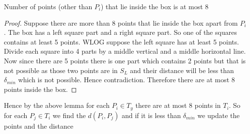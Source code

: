 \begin{center}
	\begin{minipage}{0.7\textwidth}

\begin{lemma}{}{}
	Number of points (other than $P_i$) that lie inside the box is at most 8
\end{lemma}
\begin{proof}
	Suppose there are more than 8 points that lie inside the box apart from $P_i$. The box has a left square part and a right square part. So one of the squares contains at least 5 points. WLOG suppose the left square has at least 5 points. Divide each square into 4 parts by a middle vertical and a middle horizontal line. Now since there are 5 points there is one part which contains 2 points but that is not possible as those two points are in $S_L$ and their distance will be less than $\delta_{min}$ which is not possible. Hence contradiction. Therefore there are at most 8 points inside the box.
\end{proof}\parinn

Hence by the above lemma for each $P_i\in T_y$ there are at most 8 points in $T_i$. So for each $P_j\in T_i$ we find the $d(P_i,P_j)$ and if it is less than $\delta_{min}$ we update the points and the distance
	\end{minipage}
\hspace{1cm}
\begin{minipage}{0.229\textwidth}
	



\begin{tikzpicture}[x=0.75pt,y=0.75pt,yscale=-1,xscale=1]
	

\end{tikzpicture}
\end{minipage}
\end{center}
